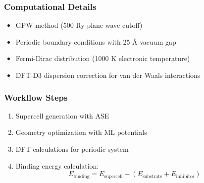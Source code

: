 \begin{frame}
\frametitle{Computational Details}
\begin{itemize}
    \item GPW method (500 Ry plane-wave cutoff)
    \item Periodic boundary conditions with 25 Å vacuum gap
    \item Fermi-Dirac distribution (1000 K electronic temperature)
    \item DFT-D3 dispersion correction for van der Waals interactions
\end{itemize}
\end{frame}

\begin{frame}
\frametitle{Workflow Steps}
\begin{enumerate}
    \item Supercell generation with ASE
    \item Geometry optimization with ML potentials
    \item DFT calculations for periodic system
    \item Binding energy calculation:
    \[ E_{\text{binding}} = E_{\text{supercell}} - (E_{\text{substrate}} + E_{\text{inhibitor}}) \]
\end{enumerate}
\end{frame} 